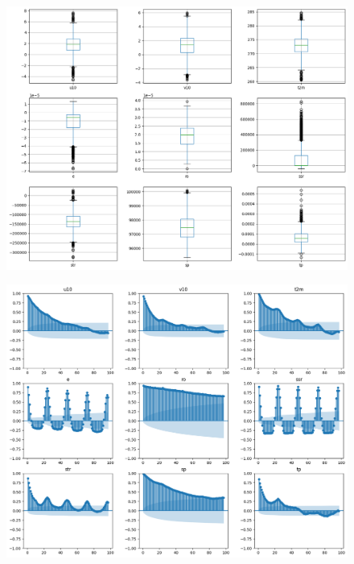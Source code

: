 \begin{figure}[H]
    \centering
    \includegraphics[width=\textwidth]{images/svr_box.png}
    \caption{}
    \label{svr-box}
\end{figure}

\begin{figure}[H]
    \centering
    \includegraphics[width=\textwidth]{images/svr_autocorr.png}
    \caption{}
    \label{svr-autocorr}
\end{figure}

